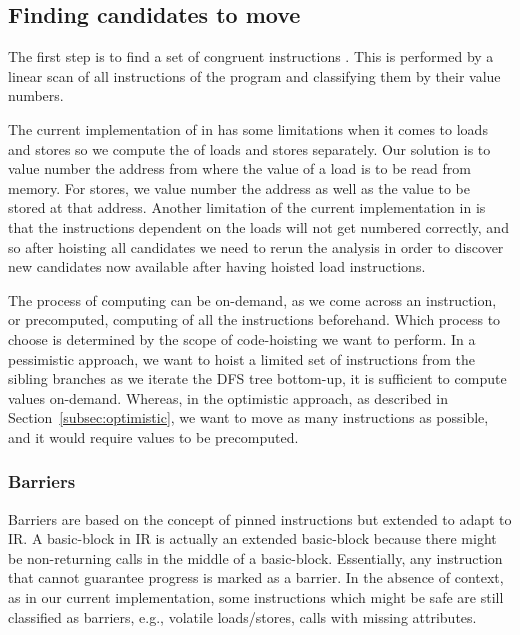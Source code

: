 \documentclass[sigplan,10pt,review,anonymous]{acmart}\settopmatter{printfolios=true,printccs=false,printacmref=false}
\begin{document}
\subsection{Finding candidates to move}
\label{subsec:finding-candidates}
The first step is to find a set of congruent instructions
\cite{briggs1997}. This is performed by a linear scan of all instructions of the
program and classifying them by their value numbers.

The current implementation of \GVN{} in \LLVM{} has some limitations when it
comes to loads and stores so we compute the \GVN{} of loads and stores
separately.  Our solution is to value number the address from where the value of
a load is to be read from memory. For stores, we value number the address as
well as the value to be stored at that address. Another limitation of the
current \GVN{} implementation in \LLVM{} is that the instructions dependent on
the loads will not get numbered correctly, and so after hoisting all candidates
we need to rerun the \GVN{} analysis in order to discover new candidates now
available after having hoisted load instructions.

The process of computing \GVN{} can be on-demand, as we come across an
instruction, or precomputed, computing \GVN{} of all the instructions
beforehand. Which process to choose is determined by the scope of code-hoisting
we want to perform. In a pessimistic approach, we want to hoist a limited set of
instructions from the sibling branches as we iterate the DFS tree bottom-up, it
is sufficient to compute \GVN{} values on-demand. Whereas, in the optimistic
approach, as described in Section~\ref{subsec:optimistic}, we want to move as
many instructions as possible, and it would require \GVN{} values to be
precomputed.

\subsubsection{Barriers}
\label{subsec:barriers}
Barriers are based on the concept of pinned instructions \cite{click1995global}
but extended to adapt to \LLVM{} IR. A basic-block in \LLVM{} IR is actually an
extended basic-block because there might be non-returning calls in the middle of
a basic-block. Essentially, any instruction that cannot guarantee progress is
marked as a barrier. In the absence of context, as in our current
implementation, some instructions which might be safe are still classified as
barriers, e.g., volatile loads/stores, calls with missing attributes.
\end{document}
